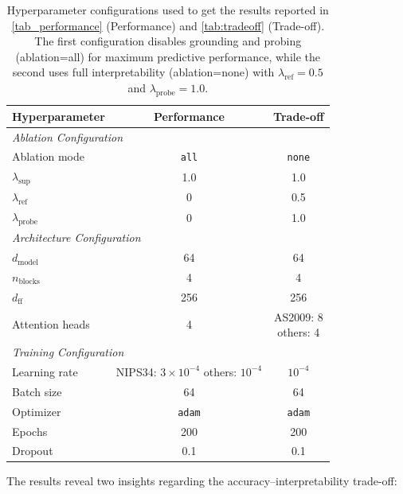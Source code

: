 \documentclass[applsci,article,submit,moreauthors,pdftex]{Definitions/mdpi}
\begin{document}
\begin{table}[htbp]
\centering
\small
\begin{tabular}{lcc}
\toprule
\textbf{Hyperparameter} & \textbf{Performance} & \textbf{Trade-off} \\
\midrule
\multicolumn{3}{l}{\textit{Ablation Configuration}} \\
Ablation mode & \texttt{all} & \texttt{none} \\
$\lambda_{\text{sup}}$ & 1.0 & 1.0 \\
$\lambda_{\text{ref}}$ & 0 & 0.5 \\
$\lambda_{\text{probe}}$ & 0 & 1.0 \\
\midrule
\multicolumn{3}{l}{\textit{Architecture Configuration}} \\
$d_{\text{model}}$ & 64 & 64 \\
$n_{\text{blocks}}$ & 4 & 4 \\
$d_{\text{ff}}$ & 256 & 256 \\
Attention heads & 4 & \makecell{AS2009: 8\\others: 4} \\
\midrule
\multicolumn{3}{l}{\textit{Training Configuration}} \\
Learning rate & \makecell{NIPS34: $3 \times 10^{-4}$\\others: $10^{-4}$} & $10^{-4}$ \\
Batch size & 64 & 64 \\
Optimizer & \texttt{adam} & \texttt{adam} \\
Epochs & 200 & 200 \\
Dropout & 0.1 & 0.1 \\
\bottomrule
\end{tabular}
\caption{Hyperparameter configurations used to get the results reported in \cref{tab_performance} (Performance) and \cref{tab:tradeoff} (Trade-off). The first configuration disables grounding and probing (ablation=all) for maximum predictive performance, while the second uses full interpretability (ablation=none) with $\lambda_{\text{ref}}=0.5$ and $\lambda_{\text{probe}}=1.0$.}
\label{tab:params}
\end{table}

The results reveal two insights regarding the accuracy--interpretability trade-off:
\end{document}
